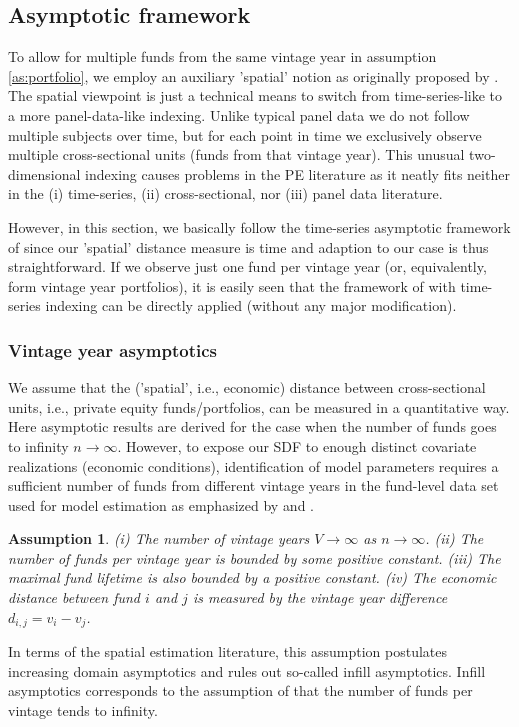 \documentclass[12pt]{article}
\newtheorem{assume}{Assumption}
\begin{document}
\subsection{Asymptotic framework}
\label{sec:asymptotic_framework}

To allow for multiple funds from the same vintage year in assumption \ref{as:portfolio}, we employ an auxiliary 'spatial' notion as originally proposed by \cite{KN16}.
The spatial viewpoint is just a technical means to switch from time-series-like to a more panel-data-like indexing.
Unlike typical panel data we do not follow multiple subjects over time, but for each point in time we exclusively observe multiple cross-sectional units (funds from that vintage year).
This unusual two-dimensional indexing causes problems in the PE literature as it neatly fits neither in the (i) time-series, (ii) cross-sectional, nor (iii) panel data literature.

However, in this section, we basically follow the time-series asymptotic framework of \cite{PP97} since our 'spatial' distance measure is time and adaption to our case is thus straightforward.
If we observe just one fund per vintage year (or, equivalently, form vintage year portfolios), it is easily seen that the framework of \cite{PP97} with time-series indexing can be directly applied (without any major modification).


\subsubsection{Vintage year asymptotics}
We assume that the ('spatial', i.e., economic) distance between cross-sectional units, i.e., private equity funds/portfolios, can be measured in a quantitative way.
Here asymptotic results are derived for the case when the number of funds goes to infinity $n \to \infty$.
However, to expose our SDF to enough distinct covariate realizations (economic conditions), identification of model parameters requires a sufficient number of funds from different vintage years in the fund-level data set used for model estimation as emphasized by \cite{DLP12} and \cite{KN16}.
\begin{assume}
	\label{as:vya}
	(i) The number of vintage years $V \to \infty$ as $n \to \infty$.
	(ii) The number of funds per vintage year is bounded by some positive constant.
	(iii) The maximal fund lifetime is also bounded by a positive constant.
	(iv) The economic distance between fund $i$ and $j$ is measured by the vintage year difference $d_{i,j}=v_i - v_j$.
\end{assume}
In terms of the spatial estimation literature, this assumption postulates increasing domain asymptotics and rules out so-called infill asymptotics. Infill asymptotics corresponds to the assumption of \cite{DLP12} that the number of funds per vintage tends to infinity.
\end{document}
